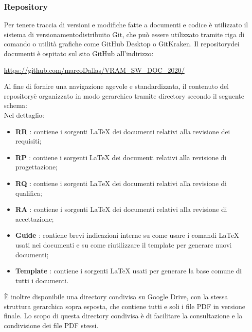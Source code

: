 	\subsubsection{Repository}
		Per tenere traccia di versioni e modifiche fatte a documenti e codice è utilizzato il sistema di versionamento\glosp distribuito Git, che può essere utilizzato tramite riga di comando o utilità grafiche come GitHub Desktop o GitKraken.
		Il repository\glosp dei documenti è ospitato sul sito GitHub all'indirizzo: 
		\begin{center}
			\url{https://github.com/marcoDallas/VRAM_SW_DOC_2020/}
		\end{center}
		Al fine di fornire una navigazione agevole e standardizzata, il contenuto del repository\glosp è organizzato in modo gerarchico tramite directory secondo il seguente schema:
		\newline
		\mbox{}\\ %
		Nel dettaglio:
		\begin{itemize}
			\item \textbf{RR} : contiene i sorgenti \LaTeX \xspace dei documenti relativi alla revisione dei requisiti;
			\item \textbf{RP} : contiene i sorgenti \LaTeX \xspace dei documenti relativi alla revisione di progettazione\glo;
			\item \textbf{RQ} : contiene i sorgenti \LaTeX \xspace dei documenti relativi alla revisione di qualifica;
			\item \textbf{RA} : contiene i sorgenti \LaTeX \xspace dei documenti relativi alla revisione di accettazione; 
			\item \textbf{Guide} : contiene brevi indicazioni interne su come usare i comandi \LaTeX \xspace usati nei documenti e su come riutilizzare il template per generare nuovi documenti;
			\item \textbf{Template} : contiene i sorgenti \LaTeX \xspace usati per generare la base comune di tutti i documenti.
		\end{itemize}
		È inoltre disponibile una directory condivisa su Google Drive, con la stessa struttura gerarchica sopra esposta, che contiene tutti e soli i file PDF in versione finale. Lo scopo di questa directory condivisa è di facilitare la consultazione e la condivisione dei file PDF stessi.
		
